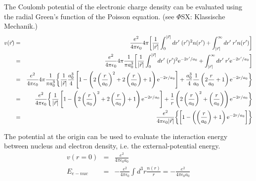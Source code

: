 \documentclass[11pt,a4paper]{report}
\begin{document}
The Coulomb potential of the electronic charge density can be
evaluated using the radial Green's function of the Poisson
equation. (see $\Phi$SX: Klassische Mechanik.)
\begin{eqnarray}
v(\vec{r})
&=&\frac{e^2}{4\pi\epsilon_0} 4\pi\biggl[ \frac{1}{|\vec{r}|}\int_0^{|\vec{r}|}dr'\; (r')^2 n(r')+\int_{|\vec{r}|}^\infty dr'\; r' n(r')\biggr]
\nonumber\\
&=&\frac{e^2}{4\pi\epsilon_0} 4\pi \frac{1}{\pi a_0^3} \biggl[ \frac{1}{|\vec{r}|}\int_0^{|\vec{r}|}dr'\; (r')^2\mathrm{e}^{-2r'/a_0}+\int_{|\vec{r}|}^\infty dr'\; r' \mathrm{e}^{-2r'/a_0}\biggr]
\nonumber\\
&=&\frac{e^2}{4\pi\epsilon_0} 4\pi \frac{1}{\pi a_0^3}
\biggl\lbrace
 \frac{1}{|\vec{r}|} \frac{a_0^3}{4}\left[1-\left(2\left(\frac{r}{a_0}\right)^2  +2\left(\frac{r}{a_0}\right)  +1\right)\mathrm{e}^{-2r/a_0}\right]
+\frac{a_0^3}{4}\frac{1}{a_0} \left(2\frac{r}{a_0}+1\right)\mathrm{e}^{-2r/a_0}
\biggr\rbrace
\nonumber\\
&=&\frac{e^2}{4\pi\epsilon_0} 
\biggl\lbrace
 \frac{1}{|\vec{r}|} \left[1-\left(2\left(\frac{r}{a_0}\right)^2  +2\left(\frac{r}{a_0}\right)  +1\right)\mathrm{e}^{-2r/a_0}\right]
+\frac{1}{r} \left(2\left(\frac{r}{a_0}\right)^2+\left(\frac{r}{a_0}\right)\right)\mathrm{e}^{-2r/a_0}
\biggr\rbrace
\nonumber\\
&=&\frac{e^2}{4\pi\epsilon_0|\vec{r}|} 
\biggl\lbrace
  \left[1-\left(\left(\frac{r}{a_0}\right)  +1\right)\mathrm{e}^{-2r/a_0}\right]
\biggr\rbrace
\label{eq:potentialfromelectronshatom}
\end{eqnarray}

The potential at the origin can be used to evaluate the interaction
energy between nucleus and electron density, i.e. the
external-potential energy.
\begin{eqnarray}
v(r=0)&=&\frac{e^2}{4\pi\epsilon_0a_0} 
\nonumber\\
E_{e-nuc}&=&-\frac{e^2}{4\pi\epsilon_0} \int d^3r \frac{n(r)}{r}=-\frac{e^2}{4\pi\epsilon_0a_0} 
\end{eqnarray}
\end{document}
